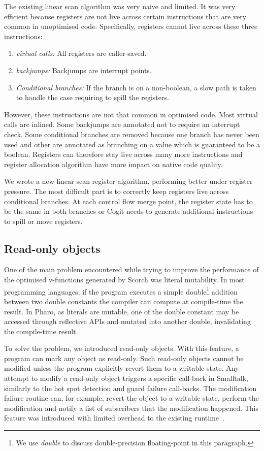\documentclass[a4paper,12pt,twoside]{../includes/ThesisStyle}
\begin{document}
The existing linear scan algorithm was very naive and limited. It was very efficient because registers are not live across certain instructions that are very common in unoptimised code. Specifically, registers cannot live across these three instructions:
\begin{enumerate}
	\item \emph{virtual calls:} All registers are caller-saved.
	\item \emph{backjumps:} Backjumps are interrupt points.
	\item \emph{Conditional branches:} If the branch is on a non-boolean, a slow path is taken to handle the case requiring to spill the registers.
\end{enumerate}

However, these instructions are not that common in optimised code. Most virtual calls are inlined. Some backjumps are annotated not to require an interrupt check. Some conditional branches are removed because one branch has never been used and other are annotated as branching on a value which is guaranteed to be a boolean. Registers can therefore stay live across many more instructions and register allocation algorithm have more impact on native code quality.

We wrote a new linear scan register algorithm, performing better under register pressure. The most difficult part is to correctly keep registers live across conditional branches. At each control flow merge point, the register state has to be the same in both branches or Cogit needs to generate additional instructions to spill or move registers.

\subsection{Read-only objects}

One of the main problem encountered while trying to improve the performance of the optimised v-functions generated by Scorch was literal mutability. In most programming languages, if the program executes a simple double\footnote{We use \emph{double} to discuss double-precision floating-point in this paragraph.} addition between two double constants the compiler can compute at compile-time the result. In Pharo, as literals are mutable, one of the double constant may be accessed through reflective APIs and mutated into another double, invalidating the compile-time result. 

To solve the problem, we introduced read-only objects. With this feature, a program can mark any object as read-only. Such read-only objects cannot be modified unless the program explicitly revert them to a writable state. Any attempt to modify a read-only object triggers a specific call-back in Smalltalk, similarly to the hot spot detection and guard failure call-backs. The modification failure routine can, for example, revert the object to a writable state, perform the modification and notify a list of subscribers that the modification happened. This feature was introduced with limited overhead to the existing runtime~\cite{Bera16b}. 
\end{document}
